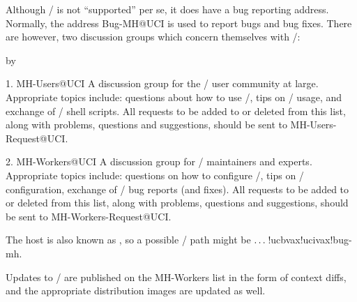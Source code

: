 Although \MH/ is not ``supported'' per se,
it does have a bug reporting address.
Normally,
the address {\tx Bug-MH@UCI} is used to report bugs and bug fixes.
There are however, 
two discussion groups which concern themselves with \MH/:
\smallskip
{\advance\leftskip by\parindent
\item{1.} MH-Users@UCI\hbreak
A discussion group for the \MH/ user community at large.
Appropriate topics include:
questions about how to use \MH/,
tips on \MH/ usage,
and exchange of \MH/ shell scripts.
All requests to be added to or deleted from this list,
along with problems,  questions and suggestions,
should be sent to {\tx MH-Users-Request@UCI}.

\item{2.} MH-Workers@UCI\hbreak
A discussion group for \MH/ maintainers and experts.
Appropriate topics include:
questions on how to configure \MH/,
tips on \MH/ configuration,
exchange of \MH/ bug reports (and fixes).
All requests to be added to or deleted from this list,
along with problems, questions and suggestions,
should be sent to {\tx MH-Workers-Request@UCI}.
\smallskip}
\noindent
The  host is also known as ,
so a possible \UUCP/ path might be {\tx $\ldots\thinspace$!ucbvax!ucivax!bug-mh}.

Updates to \MH/ are published on the {\tx MH-Workers} list
in the form of context diffs,
and the appropriate distribution images are updated as well.
